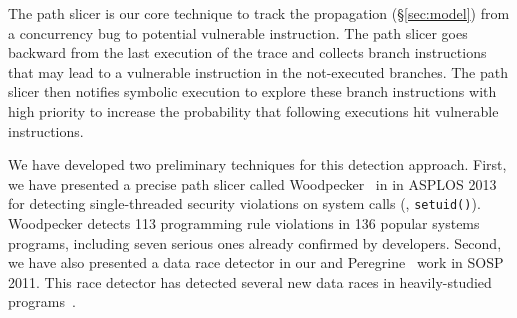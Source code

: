 The path slicer is our core technique to track the propagation 
(\S\ref{sec:model}) from a concurrency bug to potential vulnerable instruction. 
The path slicer goes backward from the last execution of the trace and collects 
branch instructions that may lead to a vulnerable instruction in the 
not-executed branches. The path slicer then notifies symbolic execution to 
explore these branch instructions with high priority to increase the 
probability that following executions hit vulnerable instructions.





 


 We have developed two preliminary techniques for 
this detection approach. First, we have presented a precise path slicer called 
Woodpecker~\cite{woodpecker:asplos13} in in ASPLOS 2013 for detecting 
single-threaded security violations on system calls (\eg, \texttt{setuid()}). 
Woodpecker detects 113 programming rule violations in 136 popular systems 
programs, including seven serious ones already confirmed by developers. Second, 
we have also presented a data race detector in our 
and Peregrine~\cite{peregrine:sosp11} work in SOSP 2011. This race 
detector has detected several new data races in 
heavily-studied programs~\cite{wu:pldi12}.

